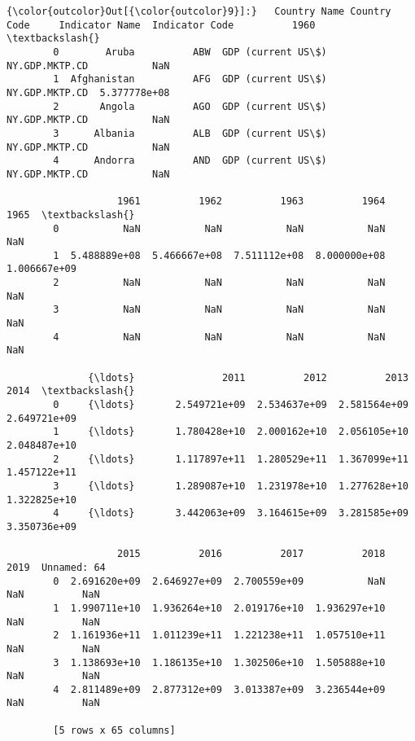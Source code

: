\documentclass[11pt]{article}
\begin{document}
\begin{Verbatim}[commandchars=\\\{\}]
{\color{outcolor}Out[{\color{outcolor}9}]:}   Country Name Country Code     Indicator Name  Indicator Code          1960  \textbackslash{}
        0        Aruba          ABW  GDP (current US\$)  NY.GDP.MKTP.CD           NaN   
        1  Afghanistan          AFG  GDP (current US\$)  NY.GDP.MKTP.CD  5.377778e+08   
        2       Angola          AGO  GDP (current US\$)  NY.GDP.MKTP.CD           NaN   
        3      Albania          ALB  GDP (current US\$)  NY.GDP.MKTP.CD           NaN   
        4      Andorra          AND  GDP (current US\$)  NY.GDP.MKTP.CD           NaN   
        
                   1961          1962          1963          1964          1965  \textbackslash{}
        0           NaN           NaN           NaN           NaN           NaN   
        1  5.488889e+08  5.466667e+08  7.511112e+08  8.000000e+08  1.006667e+09   
        2           NaN           NaN           NaN           NaN           NaN   
        3           NaN           NaN           NaN           NaN           NaN   
        4           NaN           NaN           NaN           NaN           NaN   
        
              {\ldots}               2011          2012          2013          2014  \textbackslash{}
        0     {\ldots}       2.549721e+09  2.534637e+09  2.581564e+09  2.649721e+09   
        1     {\ldots}       1.780428e+10  2.000162e+10  2.056105e+10  2.048487e+10   
        2     {\ldots}       1.117897e+11  1.280529e+11  1.367099e+11  1.457122e+11   
        3     {\ldots}       1.289087e+10  1.231978e+10  1.277628e+10  1.322825e+10   
        4     {\ldots}       3.442063e+09  3.164615e+09  3.281585e+09  3.350736e+09   
        
                   2015          2016          2017          2018  2019  Unnamed: 64  
        0  2.691620e+09  2.646927e+09  2.700559e+09           NaN   NaN          NaN  
        1  1.990711e+10  1.936264e+10  2.019176e+10  1.936297e+10   NaN          NaN  
        2  1.161936e+11  1.011239e+11  1.221238e+11  1.057510e+11   NaN          NaN  
        3  1.138693e+10  1.186135e+10  1.302506e+10  1.505888e+10   NaN          NaN  
        4  2.811489e+09  2.877312e+09  3.013387e+09  3.236544e+09   NaN          NaN  
        
        [5 rows x 65 columns]
\end{Verbatim}
            
\end{document}
